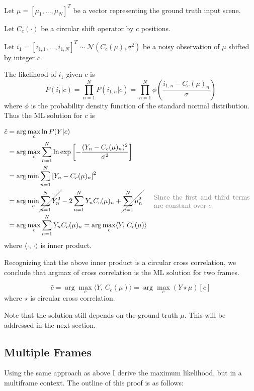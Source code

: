 \documentclass[tocnosub,noragright,centerchapter,12pt]{uiucecethesis09}
\begin{document}
Let $\mu = \left[ \mu_1, ..., \mu_N \right]^T$ be a vector representing the ground truth input scene.

Let $C_c(\cdot)$ be a circular shift operator by $c$ positions.

Let $i_1 = \left[i_{1,1}, ..., i_{1,N}\right]^T \sim \mathcal{N}(C_c(\mu), \sigma^2)$ be a noisy observation of $\mu$ shifted by integer $c$.

The likelihood of $i_1$ given $c$ is
$$P(i_1 | c) = \prod_{n=1}^N P(i_{1,n} | c) = \prod_{n=1}^N \phi \left( \frac{i_{1,n} - C_c(\mu)_n}{\sigma} \right)$$
where $\phi$ is the probability density function of the standard normal distribution.  Thus the ML solution for $c$ is

\begin{align*}
  \hat{c} &= \arg \max_c \ln P(Y | c) \\
  &= \arg \max_c \sum_{n=1}^N \ln \text{exp} \left[- \frac{(Y_n - C_c(\mu)_n)^2}{\sigma^2} \right] \\
  &= \arg \min \sum_{n=1}^N \left[Y_n - C_c(\mu)_n\right]^2 \\
  &= \arg \min_c \cancel{\sum_{n=1}^N Y_n^2} - 2\sum_{n=1}^N Y_n C_c(\mu)_n + \cancel{\sum_{n=1}^N \mu_n^2}
  && \eqcomment{Since the first and third terms are constant over $c$} \\
  &= \arg \max_c \sum_{n=1}^N Y_n C_c(\mu)_n
  = \arg \max_c \langle Y,\, C_c(\mu) \rangle
\end{align*}
where $\langle \cdot,\, \cdot \rangle$ is inner product.

Recognizing that the above inner product is a circular cross correlation, we conclude that argmax of cross correlation is the ML solution for two frames.


$$\hat{c} = \arg \max_c \langle Y,\, C_c(\mu) \rangle = \arg \max_c (Y \star \mu)[c]$$
where $\star$ is circular cross correlation.

Note that the solution still depends on the ground truth $\mu$.  This will be addressed in the next section.


\subsection{Multiple Frames}

Using the same approach as above I derive the maximum likelihood, but in a multiframe context.  The outline of this proof is as follows:
\end{document}
